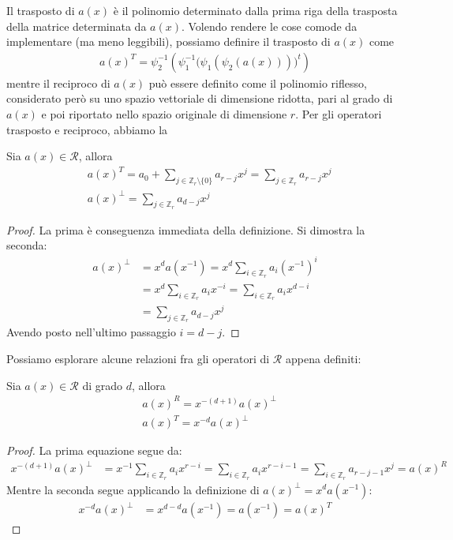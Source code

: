 \noindent
Il trasposto di $a(x)$ è il polinomio determinato dalla prima riga della trasposta della matrice determinata da $a(x)$. Volendo rendere le cose comode da implementare (ma meno leggibili), possiamo definire il trasposto di $a(x)$ come
\begin{align*}
   a(x)^{T} = \psi_{2}^{-1} ( \psi_{1}^{-1} \Big( \psi_{1} ( \psi_{2}(a(x))) \Big)^{t}    )
\end{align*}
mentre il reciproco di $a(x)$ può essere definito come il polinomio riflesso, considerato però su uno spazio vettoriale di dimensione ridotta, pari al grado di $a(x)$ e poi riportato nello spazio originale di dimensione $r$. Per gli operatori trasposto e reciproco, abbiamo la 
\begin{prop}
   Sia $a(x) \in \mathcal{R}$, allora 
   \begin{align*}
     & a(x)^{T} = a_{0} + \sum_{j \in \mathbb{Z}_{r} \setminus \lbrace 0 \rbrace } a_{r-j} x^j 
                 = \sum_{j \in \mathbb{Z}_{r} } a_{r-j} x^j \\
     & a(x)^{\perp} = \sum_{j \in \mathbb{Z}_{r}} a_{d-j}x^{j}
   \end{align*}
\end{prop}
\begin{proof}
   La prima è conseguenza immediata della definizione. Si dimostra la seconda:
   \begin{align*}
     a(x)^{\perp}  &=  x^d a(x^{-1}) =  x^d \sum_{i \in \mathbb{Z}_{r}} a_{i}(x^{-1})^{i} \\
       &= x^d \sum_{i \in \mathbb{Z}_{r}} a_{i}x^{-i} = \sum_{i \in \mathbb{Z}_{r}} a_{i}x^{d-i}  \\
       &= \sum_{j \in \mathbb{Z}_{r}} a_{d-j}x^{j}
   \end{align*}
   Avendo posto nell'ultimo passaggio $i=d-j$. 
\end{proof}
\noindent
Possiamo esplorare alcune relazioni fra gli operatori di $\mathcal{R}$ appena definiti:
\begin{prop}
  Sia $a(x) \in \mathcal{R}$ di grado $d$, allora 
  \begin{align*}
     & a(x)^{R} = x^{-(d+1)} a(x)^{\perp} \\
     & a(x)^{T} = x^{-d} a(x)^{\perp}
   \end{align*}
\end{prop}
\begin{proof}
   La prima equazione segue da:
   \begin{align*}
     x^{-(d+1)}a(x)^{\perp}  &= x^{-1} \sum_{i \in \mathbb{Z}_{r}} a_{i}x^{r-i} = \sum_{i \in \mathbb{Z}_{r}} a_{i}x^{r-i-1} = \sum_{i \in \mathbb{Z}_{r}} a_{r-j-1}x^{j}  = a(x)^{R}
   \end{align*}
   Mentre la seconda segue applicando la definizione di $a(x)^{\perp} =  x^d a(x^{-1}) $:
   \begin{align*}
     x^{-d} a(x)^{\perp}  &= x^{d-d}  a(x^{-1}) = a(x^{-1}) = a(x)^{T}
   \end{align*}
\end{proof}
